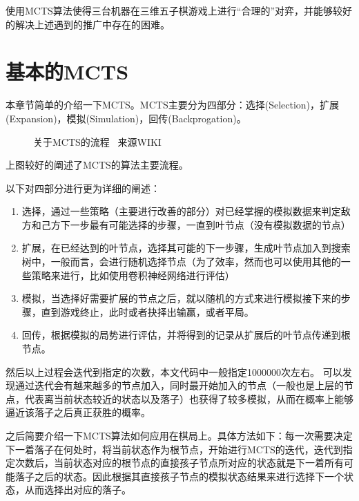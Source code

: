 \documentclass[9pt,twocolumn,twoside]{osajnl}
\begin{document}
使用MCTS算法使得三台机器在三维五子棋游戏上进行“合理的”对弈，并能够较好的解决上述遇到的推广中存在的困难。

\section{基本的MCTS}

本章节简单的介绍一下MCTS\cite{MCTS}。MCTS主要分为四部分：选择(Selection)，扩展(Expansion)，模拟(Simulation)，回传(Backprogation)。

\begin{figure}[htbp]
	\centering
	\caption{关于MCTS的流程 \ 来源WIKI \cite{MCTSGraphWiki}}
	\label{fig:false-color}
\end{figure}

上图较好的阐述了MCTS的算法主要流程。

以下对四部分进行更为详细的阐述：
\begin{enumerate}
	\item 选择，通过一些策略（主要进行改善的部分）对已经掌握的模拟数据来判定敌方和己方下一步最有可能选择的步骤，一直到叶节点（没有模拟数据的节点）
	\item 扩展，在已经达到的叶节点，选择其可能的下一步骤，生成叶节点加入到搜索树中，一般而言，会进行随机选择节点（为了效率，然而也可以使用其他的一些策略来进行，比如使用卷积神经网络进行评估）
	\item 模拟，当选择好需要扩展的节点之后，就以随机的方式来进行模拟接下来的步骤，直到游戏终止，此时或者抉择出输赢，或者平局。
	\item 回传，根据模拟的局势进行评估，并将得到的记录从扩展后的叶节点传递到根节点。
\end{enumerate}
然后以上过程会迭代到指定的次数，本文代码中一般指定1000000次左右。
可以发现通过迭代会有越来越多的节点加入，同时最开始加入的节点（一般也是上层的节点，代表离当前状态较近的状态以及落子）也获得了较多模拟，从而在概率上能够逼近该落子之后真正获胜的概率。

之后简要介绍一下MCTS算法如何应用在棋局上。具体方法如下：每一次需要决定下一着落子在何处时，将当前状态作为根节点，开始进行MCTS的迭代，迭代到指定次数后，当前状态对应的根节点的直接孩子节点所对应的状态就是下一着所有可能落子之后的状态。因此根据其直接孩子节点的模拟状态结果来进行选择下一个状态，从而选择出对应的落子。
\end{document}
